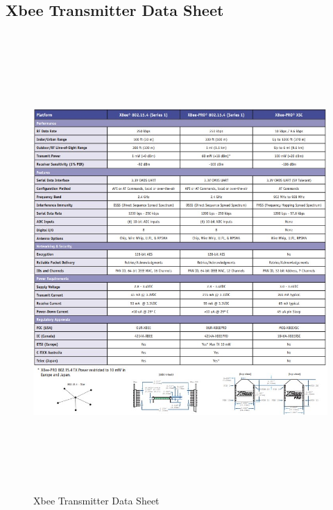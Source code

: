 \documentclass[12pt]{article}
\begin{document}
{{{{		\subsection{Xbee Transmitter Data Sheet}
			\begin{figure}[ht!]
				\centering
				\includegraphics[height=175mm]{assets/Xbee_DataSheet.jpg}
				\caption{Xbee Transmitter Data Sheet \label{overflow}}
			\end{figure}
		
}}}}
\end{document}
